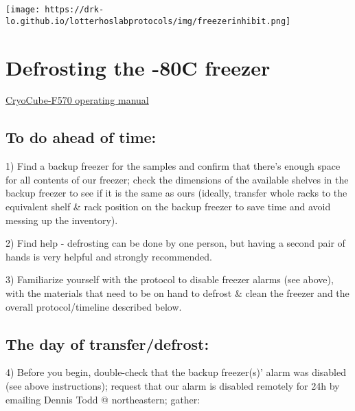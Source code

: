 \documentclass[
  letterpaper,
  DIV=11,
  numbers=noendperiod]{scrreprt}
\begin{document}
\texttt{[image: https://drk-lo.github.io/lotterhoslabprotocols/img/freezerinhibit.png]}

\hypertarget{defrosting-the--80c-freezer}{%
\section*{\texorpdfstring{\textbf{Defrosting the -80C
freezer}}{Defrosting the -80C freezer}}\label{defrosting-the--80c-freezer}}

\href{https://github.com/DrK-Lo/lotterhoslabprotocols/files/7305953/Freezers_Operating-manual_CryoCube-F570n-h-hw.pdf}{CryoCube-F570
operating manual}

\hypertarget{to-do-ahead-of-time}{%
\subsection*{\texorpdfstring{\textbf{To do ahead of
time:}}{To do ahead of time:}}\label{to-do-ahead-of-time}}

1) Find a backup freezer for the samples and confirm that there's enough
space for all contents of our freezer; check the dimensions of the
available shelves in the backup freezer to see if it is the same as ours
(ideally, transfer whole racks to the equivalent shelf \& rack position
on the backup freezer to save time and avoid messing up the inventory).

2) Find help - defrosting can be done by one person, but having a second
pair of hands is very helpful and strongly recommended.

3) Familiarize yourself with the protocol to disable freezer alarms (see
above), with the materials that need to be on hand to defrost \& clean
the freezer and the overall protocol/timeline described below.

\hypertarget{the-day-of-transferdefrost}{%
\subsection*{\texorpdfstring{\textbf{The day of
transfer/defrost:}}{The day of transfer/defrost:}}\label{the-day-of-transferdefrost}}

4) Before you begin, double-check that the backup freezer(s)' alarm was
disabled (see above instructions); request that our alarm is disabled
remotely for 24h by emailing Dennis Todd @ northeastern; gather:
\end{document}
